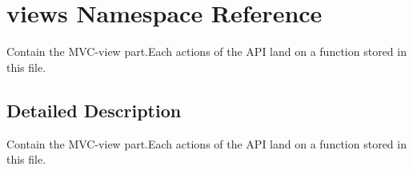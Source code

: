 \hypertarget{namespaceviews}{\section{views Namespace Reference}
\label{namespaceviews}
}


Contain the M\-V\-C-\/view part.\-Each actions of the A\-P\-I land on a function stored in this file.  




\subsection{Detailed Description}
Contain the M\-V\-C-\/view part.\-Each actions of the A\-P\-I land on a function stored in this file. 